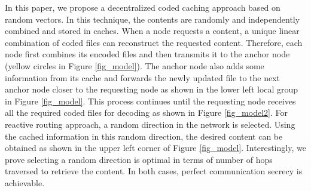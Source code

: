 \documentclass[10pt,journal]{IEEEtran}
\begin{document}
In this paper, we propose a decentralized coded caching approach based on random vectors. In this technique, the contents are randomly and independently combined and stored in  caches. %
%
When a node requests a content, a unique linear combination of coded files can reconstruct the requested content. Therefore, each node first combines its encoded files and then transmits it to the anchor node (yellow circles in  Figure \ref{fig_model}). 
The anchor node also adds some information from its cache and forwards the newly updated file to the next anchor node closer to the requesting node
as shown in the lower left local group in Figure \ref{fig_model}. 
This process continues until the requesting node receives all the required coded files for decoding as shown in Figure \ref{fig_model2}.
For reactive routing approach, a random direction in the network is selected. Using the cached information in this random direction, the desired content can be obtained as shown in the upper left corner of Figure \ref{fig_model}. Interestingly, we prove selecting a random direction is optimal in terms of number of hops traversed to retrieve the content. In both cases, perfect communication secrecy is achievable. %
\end{document}
